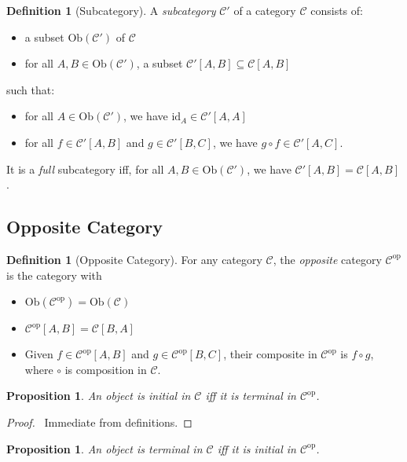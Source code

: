 \documentclass{book}
\let\qed\relax
\newtheorem{prop}[ax]{Proposition}
\theoremstyle{definition}
\newtheorem{df}[ax]{Definition}
\newcommand{\id}[1]{\ensuremath{\mathrm{id}_{#1}}}
\newcommand{\Ob}[1]{\ensuremath{\mathrm{Ob} \left( {#1} \right)}}
\newcommand{\op}[1]{\ensuremath{{#1}^{\mathrm{op}}}}
\begin{document}
\begin{df}[Subcategory]
A \emph{subcategory} $\mathcal{C}'$ of a category $\mathcal{C}$ consists of:
\begin{itemize}
\item a subset $\Ob{\mathcal{C}'}$ of $\mathcal{C}$
\item for all $A,B \in \Ob{\mathcal{C}'}$, a subset $\mathcal{C}'[A,B] \subseteq \mathcal{C}[A,B]$
\end{itemize}
such that:
\begin{itemize}
\item for all $A \in \Ob{\mathcal{C}'}$, we have $\id{A} \in \mathcal{C}'[A,A]$
\item for all $f \in \mathcal{C}'[A,B]$ and $g \in \mathcal{C}'[B,C]$, we have $g \circ f \in \mathcal{C}'[A,C]$.
\end{itemize}

It is a \emph{full} subcategory iff, for all $A,B \in \Ob{\mathcal{C}'}$, we have $\mathcal{C}'[A,B] = \mathcal{C}[A,B]$.
\end{df}

\subsection{Opposite Category}

\begin{df}[Opposite Category]
For any category $\mathcal{C}$, the \emph{opposite} category $\op{\mathcal{C}}$ is the category with
\begin{itemize}
\item $\Ob{\op{\mathcal{C}}} = \Ob{\mathcal{C}}$
\item $\op{\mathcal{C}}[A,B] = \mathcal{C}[B,A]$
\item Given $f \in \op{\mathcal{C}}[A,B]$ and $g \in \op{\mathcal{C}}[B,C]$, their composite in $\op{\mathcal{C}}$ is $f \circ g$, where $\circ$ is composition in $\mathcal{C}$.
\end{itemize}
\end{df}

\begin{prop}
An object is initial in $\mathcal{C}$ iff it is terminal in $\op{\mathcal{C}}$.
\end{prop}

\begin{proof}
\pf\ Immediate from definitions. \qed
\end{proof}

\begin{prop}
An object is terminal in $\mathcal{C}$ iff it is initial in $\op{\mathcal{C}}$.
\end{prop}
\end{document}
